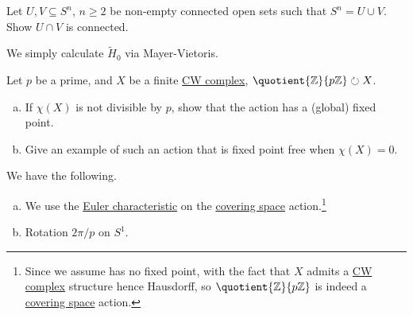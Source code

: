 \begin{exercise}[QR Jan. 2016]
	Let \(U, V\subseteq S^n\), \(n \geq 2\) be non-empty connected open sets such that \(S^n = U \cup V\). Show \(U \cap V\) is
	connected.
\end{exercise}
\begin{answer}
	We simply calculate \(\widetilde{H} _0\) via Mayer-Vietoris.
\end{answer}

\begin{exercise}[QR Jan. 2016]
	Let \(p\) be a prime, and \(X\) be a finite \hyperref[def:CW-Complex]{CW complex}, \(\quotient{\mathbb{\MakeUppercase{z}} }{p \mathbb{\MakeUppercase{z}} }\circlearrowright X \).

	\begin{enumerate}[(a)]
		\item If \(\chi (X)\) is not divisible by \(p\), show that the action has a (global) fixed point.
		\item Give an example of such an action that is fixed point free when \(\chi (X) = 0\).
	\end{enumerate}
\end{exercise}
\begin{answer}
	We have the following.
	\begin{enumerate}[(a)]
		\item We use the \hyperref[def:Euler-characteristic]{Euler characteristic} on the \hyperref[def:covering-space]{covering space} action.\footnote{Since we assume
			      has no fixed point, with the fact that \(X\) admits a \hyperref[def:CW-Complex]{CW complex}
			      structure hence Hausdorff, so \(\quotient{\mathbb{\MakeUppercase{z}} }{p\mathbb{\MakeUppercase{z}} } \) is indeed a \hyperref[def:covering-space]{covering space} action.}
		\item Rotation \(2\pi / p\) on \(S^1\).
	\end{enumerate}
\end{answer}